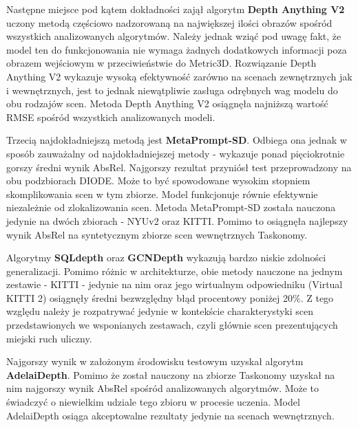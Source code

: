 Następne miejsce pod kątem dokładności zajął algorytm \textbf{Depth Anything V2} uczony metodą częściowo nadzorowaną na największej ilości obrazów spośród wszystkich analizowanych algorytmów. Należy jednak wziąć pod uwagę fakt, że model ten do funkcjonowania nie wymaga żadnych dodatkowych informacji poza obrazem wejściowym w przeciwieństwie do Metric3D. Rozwiązanie Depth Anything V2 wykazuje wysoką efektywność zarówno na scenach zewnętrznych jak i wewnętrznych, jest to jednak niewątpliwie zasługa odrębnych wag modelu do obu rodzajów scen. Metoda Depth Anything V2 osiągnęła najniższą wartość RMSE spośród wszystkich analizowanych modeli.

Trzecią najdokładniejszą metodą jest \textbf{MetaPrompt-SD}. Odbiega ona jednak w sposób zauważalny od najdokładniejszej metody - wykazuje ponad pięciokrotnie gorszy średni wynik AbsRel. Najgorszy rezultat przyniósł test przeprowadzony na obu podzbiorach DIODE. Może to być spowodowane wysokim stopniem skomplikowania scen w tym zbiorze. Model funkcjonuje równie efektywnie niezależnie od zlokalizowania scen. Metoda MetaPrompt-SD została nauczona jedynie na dwóch zbiorach - NYUv2 oraz KITTI. Pomimo to osiągnęła najlepszy wynik AbsRel na syntetycznym zbiorze scen wewnętrznych Taskonomy.

Algorytmy \textbf{SQLdepth} oraz \textbf{GCNDepth} wykazują bardzo niskie zdolności generalizacji. Pomimo różnic w architekturze, obie metody nauczone na jednym zestawie - KITTI - jedynie na nim oraz jego wirtualnym odpowiedniku (Virtual KITTI 2) osiągnęły średni bezwzględny błąd procentowy poniżej 20\%. Z tego względu należy je rozpatrywać jedynie w kontekście charakterystyki scen przedstawionych we wsponianych zestawach, czyli głównie scen prezentujących miejski ruch uliczny.

Najgorszy wynik w założonym środowisku testowym uzyskał algorytm \textbf{AdelaiDepth}. Pomimo że został nauczony na zbiorze Taskonomy uzyskał na nim najgorszy wynik AbsRel spośród analizowanych algorytmów. Może to świadczyć o niewielkim udziale tego zbioru w procesie uczenia. Model AdelaiDepth osiąga akceptowalne rezultaty jedynie na scenach wewnętrznych.


